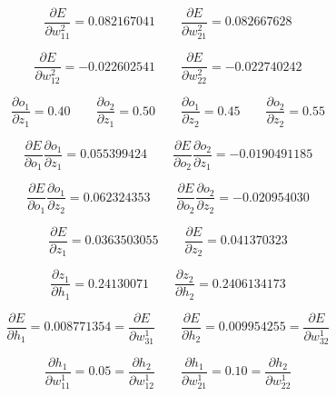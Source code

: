 \begin{equation*}
    \frac{\partial E}{\partial w_{11}^2} = 0.082167041
    \qquad 
    \frac{\partial E}{\partial w_{21}^2} = 0.082667628
\end{equation*}

\begin{equation*}
    \frac{\partial E}{\partial w_{12}^2} = -0.022602541
    \qquad 
    \frac{\partial E}{\partial w_{22}^2} = -0.022740242
\end{equation*}

\begin{equation*}
    \frac{\partial o_1}{\partial z_1} = 0.40
    \qquad 
    \frac{\partial o_2}{\partial z_1} = 0.50
    \qquad 
    \frac{\partial o_1}{\partial z_2} = 0.45
    \qquad 
    \frac{\partial o_2}{\partial z_2} = 0.55
\end{equation*}

\begin{equation*}
    \frac{\partial E}{\partial o_1} \frac{\partial o_1}{\partial z_1} = 0.055399424
    \qquad 
    \frac{\partial E}{\partial o_2} \frac{\partial o_2}{\partial z_1} = -0.0190491185
\end{equation*}

\begin{equation*}
    \frac{\partial E}{\partial o_1} \frac{\partial o_1}{\partial z_2} = 0.062324353
    \qquad 
    \frac{\partial E}{\partial o_2} \frac{\partial o_2}{\partial z_2} = -0.020954030
\end{equation*}

\begin{equation*}
    \frac{\partial E}{\partial z_1} = 0.0363503055
    \qquad 
    \frac{\partial E}{\partial z_2} = 0.041370323
\end{equation*}

\begin{equation*}
    \frac{\partial z_1}{\partial h_1} = 0.24130071
    \qquad 
    \frac{\partial z_2}{\partial h_2} = 0.2406134173
\end{equation*}

\begin{equation*}
    \frac{\partial E}{\partial h_1} = 0.008771354 = \frac{\partial E}{\partial w_{31}^1}
    \qquad 
    \frac{\partial E}{\partial h_2} = 0.009954255 = \frac{\partial E}{\partial w_{32}^1}
\end{equation*}

\begin{equation*}
    \frac{\partial h_1}{\partial w_{11}^1} = 0.05 = \frac{\partial h_2}{\partial w_{12}^1}
    \qquad 
    \frac{\partial h_1}{\partial w_{21}^1} = 0.10 = \frac{\partial h_2}{\partial w_{22}^1}
\end{equation*}

